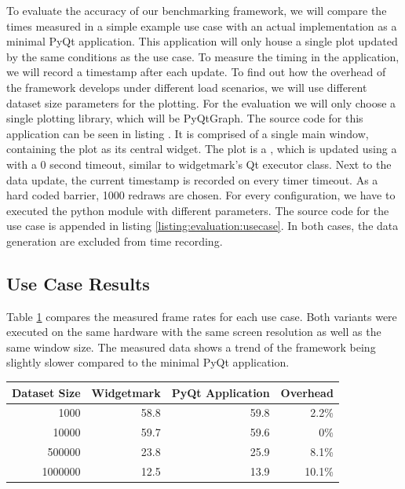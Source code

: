 To evaluate the accuracy of our benchmarking framework, we will compare the
times measured in a simple example use case with an actual implementation as a
minimal PyQt application. This application will only house a single plot updated
by the same conditions as the use case. To measure the timing in the
application, we will record a timestamp after each update. To find out how the
overhead of the framework develops under different load scenarios, we will use
different dataset size parameters for the plotting. For the evaluation we will
only choose a single plotting library, which will be PyQtGraph. The source code
for this application can be seen in listing . It
is comprised of a single main window, containing the plot as its central widget.
The plot is a , which is updated
using a  with a 0 second timeout, similar to
widgetmark's Qt executor class. Next to the data update, the current timestamp
is recorded on every timer timeout. As a hard coded barrier, 1000 redraws are
chosen. For every configuration, we have to executed the python module with
different parameters. The source code for the use case is appended in listing
\ref{listing:evaluation:usecase}. In both cases, the data generation are
excluded from time recording.

\subsection{Use Case Results}

Table \ref{tab:evaluation} compares the measured frame rates for each use case.
Both variants were executed on the same hardware with the same screen resolution
as well as the same window size. The measured data shows a trend of the
framework being slightly slower compared to the minimal PyQt application.

\begin{table}[h]
\begin{center}

\label{tab:evaluation}

\begin{tabular}{rrrr}

\hline
Dataset Size & Widgetmark & PyQt Application & Overhead \\
\hline
1000         & 58.8       & 59.8             & 2.2\%    \\
10000        & 59.7       & 59.6             & 0\%      \\
500000       & 23.8       & 25.9             & 8.1\%    \\
1000000      & 12.5       & 13.9             & 10.1\%   \\
\hline

\end{tabular}
\end{center}
\end{table}

